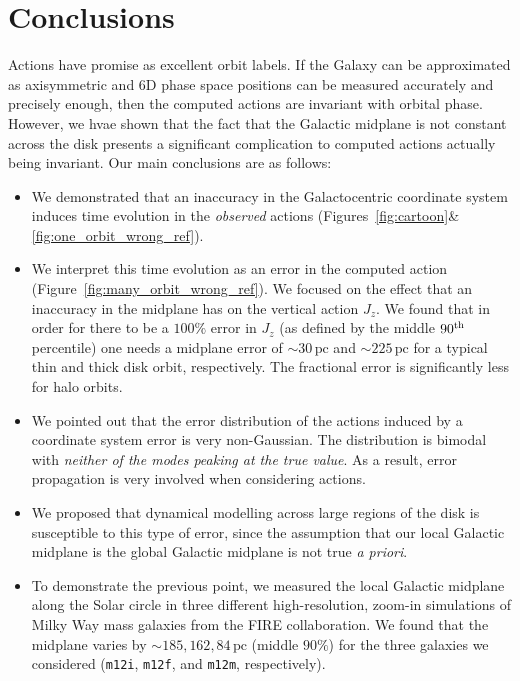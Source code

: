 \documentclass[twocolumn]{aastex62}
\newcommand{\pc}{\text{pc}}
\newcommand{\mi}{\texttt{m12i}}
\newcommand{\mf}{\texttt{m12f}}
\newcommand{\mm}{\texttt{m12m}}
\newcommand{\uth}{\textsuperscript{th}}
\begin{document}
\section{Conclusions}\label{sec:conclusion}
Actions have promise as excellent orbit labels. If the Galaxy can be
approximated as axisymmetric and 6D phase space positions can be measured
accurately and precisely enough, then the computed actions are invariant with
orbital phase. However, we hvae shown that the fact that the Galactic midplane
is not constant across the disk presents a significant complication to
computed actions actually being invariant. Our main conclusions are as
follows:

\begin{itemize}
\item We demonstrated that an inaccuracy in the Galactocentric coordinate
system induces time evolution in the {\em observed} actions
(Figures~\ref{fig:cartoon}\&\ref{fig:one_orbit_wrong_ref}). 

\item We interpret this time evolution as an error in the computed action
(Figure~\ref{fig:many_orbit_wrong_ref}). We focused on the effect that an
inaccuracy in the midplane has on the vertical action $J_z$. We found that in
order for there to be a $100\%$ error in $J_z$ (as defined by the middle
$90\uth$ percentile) one needs a midplane error of $\sim30\,\pc$ and
$\sim225\,\pc$ for a typical thin and thick disk orbit, respectively. The
fractional error is significantly less for halo orbits.

\item We pointed out that the error distribution of the actions induced by a
coordinate system error is very non-Gaussian. The distribution is bimodal with
{\em neither of the modes peaking at the true value}. As a result, error
propagation is very involved when considering actions.

\item We proposed that dynamical modelling across large regions of the disk is
susceptible to this type of error, since the assumption that our local
Galactic midplane is the global Galactic midplane is not true {\em a priori}.

\item To demonstrate the previous point, we measured the local Galactic
midplane along the Solar circle in three different high-resolution, zoom-in
simulations of Milky Way mass galaxies from the FIRE collaboration. We found
that the midplane varies by $\sim185, 162, 84\,\pc$ (middle $90\%$) for the
three galaxies we considered (\mi , \mf , and \mm , respectively).

\end{itemize}
\end{document}
